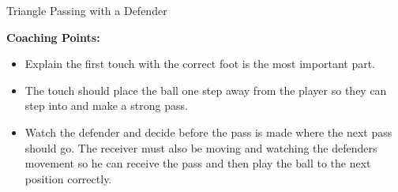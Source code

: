 \begin{evenBlock}{Triangle Passing with a Defender}
\begin{minipage}[t]{\linewidth}
\end{minipage}
\raggedright
    \textbf{Coaching Points:}
    \begin{itemize}
        \setlength{\itemsep}{0pt}
        \setlength{\parskip}{0pt}
        \setlength{\parsep}{0pt}
        \item Explain the first touch with the correct foot is the most important part.
        \item The touch should place the ball one step away from the player so they can step into and make a strong pass.
        \item Watch the defender and decide before the pass is made where the next pass should go.  The receiver must also be moving and watching the defenders movement so he can receive the pass and then play the ball to the next position correctly.
    \end{itemize}

\end{evenBlock}
